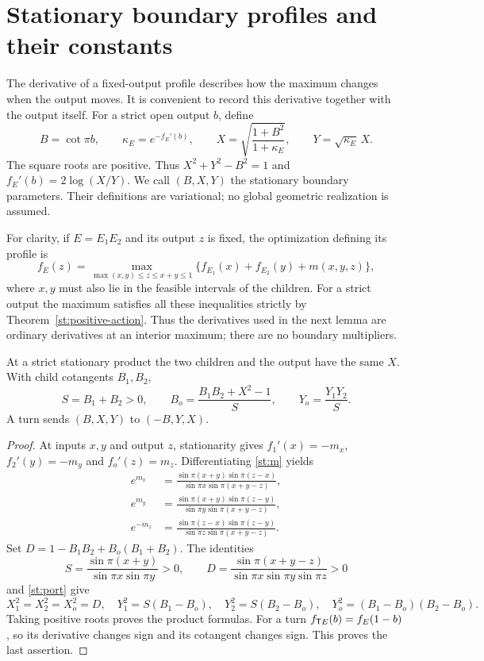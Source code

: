 \section{Stationary boundary profiles and their constants}\label{st:profile-section}\label{nt:boundary}
The derivative of a fixed-output profile describes how the
maximum changes when the output moves. It is convenient to
record this derivative together with the output itself.
For a strict open output $b$, define
\begin{equation}\label{st:port}
 B=\cot\pi b,\qquad \kappa_E=e^{-f_E'(b)},\qquad
 X=\sqrt{\frac{1+B^2}{1+\kappa_E}},\qquad
 Y=\sqrt{\kappa_E}\,X .
\end{equation}
The square roots are positive. Thus
$X^2+Y^2-B^2=1$ and $f_E'(b)=2\log(X/Y)$.
We call $(B,X,Y)$ the stationary boundary parameters.
Their definitions are variational; no global geometric
realization is assumed.

For clarity, if $E=E_1E_2$ and its output $z$ is fixed, the
optimization defining its profile is
\[
 f_E(z)=\max_{\max(x,y)\le z\le x+y\le1}
       \{f_{E_1}(x)+f_{E_2}(y)+m(x,y,z)\},
\]
where $x,y$ must also lie in the feasible intervals of the children.
For a strict output the maximum satisfies all these inequalities
strictly by Theorem~\ref{st:positive-action}. Thus the derivatives
used in the next lemma are ordinary derivatives at an interior
maximum; there are no boundary multipliers.

\begin{lemma}\label{st:port-product}
At a strict stationary product the two children and the
output have the same $X$. With child cotangents $B_1,B_2$,
\begin{equation}\label{st:port-product-equations}
 S=B_1+B_2>0,\qquad
 B_o=\frac{B_1B_2+X^2-1}{S},\qquad
 Y_o=\frac{Y_1Y_2}{S}.
\end{equation}
A turn sends $(B,X,Y)$ to $(-B,Y,X)$.
\end{lemma}
\begin{proof}
At inputs $x,y$ and output $z$, stationarity gives
$f_1'(x)=-m_x$, $f_2'(y)=-m_y$ and $f_o'(z)=m_z$.
Differentiating \eqref{st:m} yields
\begin{align*}
 e^{m_x}&=\frac{\sin\pi(x+y)\sin\pi(z-x)}
                  {\sin\pi x\sin\pi(x+y-z)},\\
 e^{m_y}&=\frac{\sin\pi(x+y)\sin\pi(z-y)}
                  {\sin\pi y\sin\pi(x+y-z)},\\
 e^{-m_z}&=\frac{\sin\pi(z-x)\sin\pi(z-y)}
                  {\sin\pi z\sin\pi(x+y-z)}.
\end{align*}
Set $D=1-B_1B_2+B_o(B_1+B_2)$. The identities
\[
 S=\frac{\sin\pi(x+y)}{\sin\pi x\sin\pi y}>0,\qquad
 D=\frac{\sin\pi(x+y-z)}
          {\sin\pi x\sin\pi y\sin\pi z}>0
\]
and \eqref{st:port} give
\[
 X_1^2=X_2^2=X_o^2=D,\quad
 Y_1^2=S(B_1-B_o),\quad Y_2^2=S(B_2-B_o),\quad
 Y_o^2=(B_1-B_o)(B_2-B_o).
\]
Taking positive roots proves the product formulas.
For a turn $f_{\mathsf T E}(b)=f_E(1-b)$, so its derivative
changes sign and its cotangent changes sign. This
proves the last assertion.
\end{proof}

